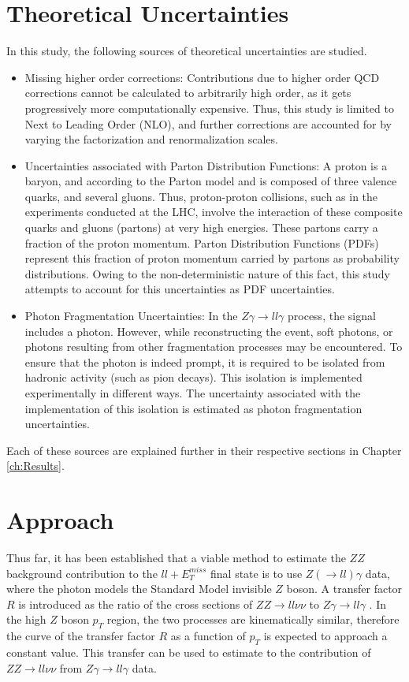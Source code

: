 \documentclass[11pt,a4paper,openright,twoside]{report}
\newcommand{\ZZ}{$ZZ\to ll\nu\nu$ }
\newcommand{\Zg}{$Z\gamma\to ll\gamma$ }
\newcommand{\met}{$E_T^{miss}$ }
\begin{document}
\section{Theoretical Uncertainties}
In this study, the following sources of theoretical uncertainties are studied.
\begin{itemize}
\item Missing higher order corrections: Contributions due to higher order QCD corrections cannot be calculated to arbitrarily high order, as it gets progressively more computationally expensive. Thus, this study is limited to Next to Leading Order (NLO), and further corrections are accounted for by varying the factorization and renormalization scales.

\item Uncertainties associated with Parton Distribution Functions: A proton is a baryon, and according to the Parton model \cite{parton_model} and is composed of three valence quarks, and several gluons. Thus, proton-proton collisions, such as in the experiments conducted at the LHC, involve the interaction of these composite quarks and gluons (partons) at very high energies. These partons carry a fraction of the proton momentum. Parton Distribution Functions (PDFs) represent this fraction of proton momentum carried by partons as probability distributions. Owing to the non-deterministic nature of this fact, this study attempts to account for this uncertainties as PDF uncertainties.

\item Photon Fragmentation Uncertainties: In the \Zg process, the signal includes a photon. However, while reconstructing the event, soft photons, or photons resulting from other fragmentation processes may be encountered. To ensure that the photon is indeed prompt, it is required to be isolated from hadronic activity (such as pion decays). This isolation is implemented experimentally in different ways. The uncertainty associated with the implementation of this isolation is estimated as photon fragmentation uncertainties.
\end{itemize}

Each of these sources are explained further in their respective sections in Chapter \ref{ch:Results}.

\section{Approach}
Thus far, it has been established that a viable method to estimate the $ZZ$ background contribution to the $ll+$\met final state is to use $Z(\to ll)\gamma$ data, where the photon models the Standard Model invisible $Z$ boson. A transfer factor $R$ is introduced as the ratio of the cross sections of \ZZ to \Zg. In the high $Z$ boson $p_T$ region, the two processes are kinematically similar, therefore the curve of the transfer factor $R$ as a function of $p_T$ is expected to approach a constant value. This transfer can be used to estimate to the contribution of \ZZ from \Zg data.
\end{document}
